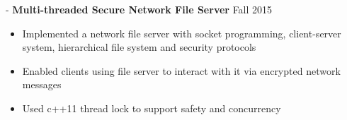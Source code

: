 \documentclass[12pt]{res}
\begin{document}
\begin{resume}
 -\sectionwidth \resumewidth
 \textbf{Multi-threaded Secure Network File Server}   \hfill{Fall 2015} \hspace{-0.58in}\vspace{-0mm}\\
  \vspace{-14pt}
 \begin{itemize}[leftmargin=-0.1in]
  \item Implemented a network file server with socket programming, client-server system, hierarchical file system and security protocols\vspace{-4pt}
  \item Enabled clients using file server to interact with it via encrypted network messages \vspace{-4pt}
  \item Used c++11 thread lock to support safety and concurrency\vspace{-3pt}
  \end{itemize}\vspace{-10pt}
   

%






\end{resume}
\end{document}
